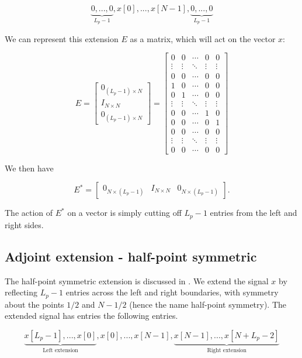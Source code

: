 \documentclass{article}
\theoremstyle{mystuff}
\theoremstyle{myexample}
\theoremstyle{named}
\begin{document}
\[ \underbrace{0, ..., 0}_{L_p-1}, x[0], ..., x[N-1], \underbrace{0, ..., 0}_{L_p-1} \]

\noindent We can represent this extension $E$ as a matrix, which will act on the vector $x$:

\[ E = \begin{bmatrix} 0_{(L_p-1)\times N}\\ I_{N\times N}\\ 0_{(L_p-1)\times N}\end{bmatrix} = \begin{bmatrix} 0 & 0 & \cdots & 0 & 0\\ \vdots & \vdots &\ddots & \vdots & \vdots\\ 0 & 0 & \cdots & 0 & 0\\[0.5em] 1 & 0 & \cdots & 0 & 0\\ 0 & 1 & \cdots & 0 & 0\\ \vdots & \vdots & \ddots & \vdots & \vdots\\ 0 & 0 & \cdots & 1 & 0\\ 0 & 0 & \cdots & 0 & 1\\[0.5em] 0 & 0 & \cdots & 0 & 0\\ \vdots & \vdots & \ddots & \vdots & \vdots\\ 0 & 0 & \cdots & 0 & 0\end{bmatrix} \] 

\noindent We then have

\[ E^\ast = \begin{bmatrix} 0_{N\times (L_p-1)} & I_{N\times N} & 0_{N\times (L_p-1)} \end{bmatrix}. \] 

\noindent The action of $E^\ast$ on a vector is simply cutting off $L_p-1$ entries from the left and right sides.\\


\subsection{Adjoint extension - half-point symmetric}
The half-point symmetric extension is discussed in \cite{strang_1996}.  We extend the signal $x$ by reflecting $L_p-1$ entries across the left and right boundaries, with symmetry about the points $1/2$ and $N-1/2$ (hence the name half-point symmetry).  The extended signal has entries the following entries.

\[ \underbrace{x[L_p-1], ..., x[0]}_\text{Left extension}, x[0], ..., x[N-1], \underbrace{x[N-1], ..., x[N+L_p-2]}_\text{Right extension}  \] 
\end{document}
